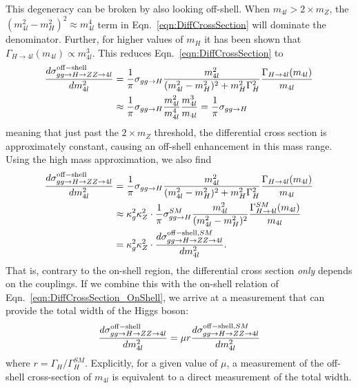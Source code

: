 This degeneracy can be broken by also looking off-shell. When $m_{4l}>2\times m_{Z}$, the $(m_{4l}^2-m_{H}^2)^2 \approx m_{4l}^4$ term in Eqn.~\ref{eqn:DiffCrossSection} will dominate the denominator. Further, for higher values of $m_H$ it has been shown \cite{Bredenstein:2006rh} that $\Gamma_{H\rightarrow 4l}(m_{4l}) \propto m_{4l}^3$. This reduces Eqn.~\ref{eqn:DiffCrossSection} to
\begin{equation}
\begin{split}
\frac{d\sigma_{gg\rightarrow H\rightarrow ZZ\rightarrow 4l}^{\rm off-shell}}{dm^2_{4l}} &= \frac{1}{\pi} \sigma_{gg\rightarrow H} \frac{m_{4l}^2}{(m_{4l}^2-m_{H}^2)^2+m_H^2\Gamma_{H}^2}\frac{\Gamma_{H\rightarrow 4l}(m_{4l})}{m_{4l}} \\
&\approx \frac{1}{\pi} \sigma_{gg\rightarrow H} \frac{m_{4l}^2}{m_{4l}^4}\frac{m_{4l}^3}{m_{4l}} = \frac{1}{\pi} \sigma_{gg\rightarrow H}
\end{split}
\label{eqn:DiffCrossSection_OffShell}
\end{equation}
meaning that just past the $2\times m_{Z}$ threshold, the differential cross section is approximately constant, causing an off-shell enhancement in this mass range. Using the high mass approximation, we also find
\begin{equation}
\begin{split}
\frac{d\sigma_{gg\rightarrow H\rightarrow ZZ\rightarrow 4l}^{\rm off-shell}}{dm^2_{4l}} &= \frac{1}{\pi} \sigma_{gg\rightarrow H} \frac{m_{4l}^2}{(m_{4l}^2-m_{H}^2)^2+m_H^2\Gamma_{H}^2}\frac{\Gamma_{H\rightarrow 4l}(m_{4l})}{m_{4l}} \\
&\approx \kappa_g^2\kappa_Z^2 \cdot \frac{1}{\pi} \sigma_{gg\rightarrow H}^{SM} \frac{m_{4l}^2}{(m_{4l}^2-m_{H}^2)^2}\frac{\Gamma_{H\rightarrow 4l}^{SM}(m_{4l})}{m_{4l}} \\
&= \kappa_g^2\kappa_Z^2 \cdot \frac{d\sigma_{gg\rightarrow H\rightarrow ZZ\rightarrow 4l}^{{\rm off-shell},SM}}{dm^2_{4l}}.
\end{split}
\end{equation}
That is, contrary to the on-shell region, the differential cross section \textit{only} depends on the couplings. If we combine this with the on-shell relation of Eqn.~\ref{eqn:DiffCrossSection_OnShell}, we arrive at a measurement that can provide the total width of the Higgs boson:
\begin{equation}
\frac{d\sigma_{gg\rightarrow H\rightarrow ZZ\rightarrow 4l}^{\rm off-shell}}{dm^2_{4l}} = \mu r \frac{d\sigma_{gg\rightarrow H\rightarrow ZZ\rightarrow 4l}^{{\rm off-shell},SM}}{dm^2_{4l}}
\label{eqn:OffShellMeasurement}
\end{equation}
where $r=\Gamma_{H}/\Gamma_{H}^{SM}$. Explicitly, for a given value of $\mu$, a measurement of the off-shell cross-section of $m_{4l}$ is equivalent to a direct measurement of the total width.

